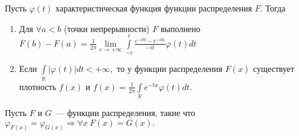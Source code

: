 	\begin{theorem}
		Пусть $\varphi(t)$ характеристическая функция функции распределения $F$. Тогда
		\begin{enumerate}
			\item Для $\forall a < b$ (точки непрерывности) $F$ выполнено
			$F(b) - F(a) = \frac{1}{2\pi} \lim\limits_{c \to +\infty} \int\limits_{-c}^{c} \frac{e^{-itb} - e^{-ita}}{-it}\varphi(t)dt$
			\item Если $\int\limits_\mathbb{R}|\varphi(t)|dt < +\infty,$ то у функции распределения $F(x)$ существует плотность $f(x)$ и $f(x) = \frac{1}{2\pi}\int\limits_\mathbb{R} e^{-tx}\varphi(t)dt.$
		\end{enumerate}
	\end{theorem}
	
	\begin{theorem}[единственности]
		Пусть \(F\) и \(G\)~--- функции распределения, такие что \(\varphi_{F(x)} = \varphi_{G(x)} \Rightarrow \forall x~F(x) = G(x).\)
	\end{theorem}
